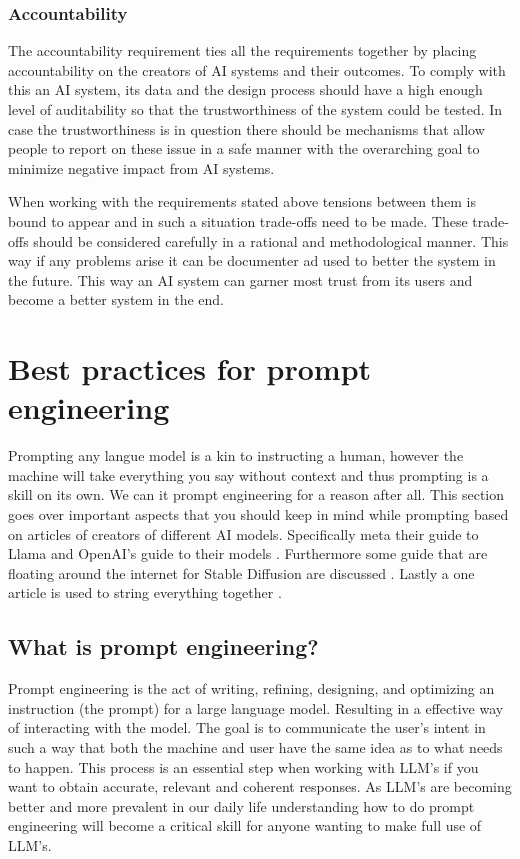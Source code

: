 \subsubsection*{Accountability}
The accountability requirement ties all the requirements together by placing accountability on the creators of AI systems and their outcomes. To comply with this an AI system, its data and the design process should have a high enough level of auditability so that the trustworthiness of the system could be tested. In case the trustworthiness is in question there should be mechanisms that allow people to report on these issue in a safe manner with the overarching goal to minimize negative impact from AI systems.

When working with the requirements stated above tensions between them is bound to appear and in such a situation trade-offs need to be made. These trade-offs should be considered carefully in a rational and methodological manner. This way if any problems arise it can be documenter ad used to better the system in the future. This way an AI system can garner most trust from its users and become a better system in the end.

\section{Best practices for prompt engineering}
Prompting any langue model is a kin to instructing a human, however the machine will take everything you say without context and thus prompting is a skill on its own. We can it prompt engineering for a reason after all. This section goes over important aspects that you should keep in mind while prompting based on articles of creators of different AI models. Specifically meta their guide to Llama \cite{MetaPrompting} and OpenAI's guide to their models \cite{OpenAIBestPractices}. Furthermore some guide that are floating around the internet for Stable Diffusion are discussed \cite{SDPrompting,SDModels}. Lastly a one article is used to string everything together \cite{ekin2023prompt}. 

\subsection{What is prompt engineering?}
Prompt engineering is the act of writing, refining, designing, and optimizing an instruction (the prompt) for a large language model. Resulting in a effective way of interacting with the model. The goal is to communicate the user's intent in such a way that both the machine and user have the same idea as to what needs to happen. This process is an essential step when working with LLM's if you want to obtain accurate, relevant and coherent responses. As LLM's are becoming better and more prevalent in our daily life understanding how to do prompt engineering will become a critical skill for anyone wanting to make full use of LLM's.

